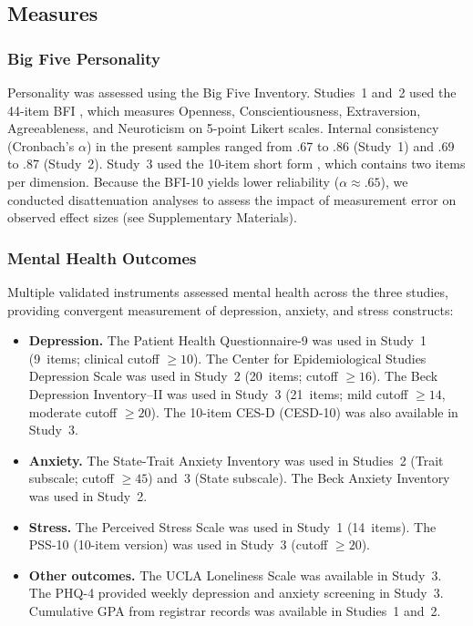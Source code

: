 \documentclass[12pt, a4paper]{article}
\begin{document}
\subsection{Measures}

\subsubsection{Big Five Personality}

Personality was assessed using the Big Five Inventory. Studies~1 and~2 used the 44-item BFI \citep[BFI-44;][]{john1999big}, which measures Openness, Conscientiousness, Extraversion, Agreeableness, and Neuroticism on 5-point Likert scales. Internal consistency (Cronbach's $\alpha$) in the present samples ranged from .67 to .86 (Study~1) and .69 to .87 (Study~2). Study~3 used the 10-item short form \citep[BFI-10;][]{rammstedt2007measuring}, which contains two items per dimension. Because the BFI-10 yields lower reliability ($\alpha \approx .65$), we conducted disattenuation analyses to assess the impact of measurement error on observed effect sizes (see Supplementary Materials).

\subsubsection{Mental Health Outcomes}

Multiple validated instruments assessed mental health across the three studies, providing convergent measurement of depression, anxiety, and stress constructs:

\begin{itemize}
    \item \textbf{Depression.} The Patient Health Questionnaire-9 \citep[PHQ-9;][]{kroenke2001phq9} was used in Study~1 (9~items; clinical cutoff $\geq 10$). The Center for Epidemiological Studies Depression Scale \citep[CES-D;][]{radloff1977cesd} was used in Study~2 (20~items; cutoff $\geq 16$). The Beck Depression Inventory--II \citep[BDI-II;][]{beck1996bdi} was used in Study~3 (21~items; mild cutoff $\geq 14$, moderate cutoff $\geq 20$). The 10-item CES-D (CESD-10) was also available in Study~3.
    \item \textbf{Anxiety.} The State-Trait Anxiety Inventory \citep[STAI;][]{spielberger1983manual} was used in Studies~2 (Trait subscale; cutoff $\geq 45$) and~3 (State subscale). The Beck Anxiety Inventory \citep[BAI;][]{beck1988inventory} was used in Study~2.
    \item \textbf{Stress.} The Perceived Stress Scale \citep[PSS;][]{cohen1983global} was used in Study~1 (14~items). The PSS-10 (10-item version) was used in Study~3 (cutoff $\geq 20$).
    \item \textbf{Other outcomes.} The UCLA Loneliness Scale \citep{russell1996ucla} was available in Study~3. The PHQ-4 \citep{lowe2010phq4} provided weekly depression and anxiety screening in Study~3. Cumulative GPA from registrar records was available in Studies~1 and~2.
\end{itemize}
\end{document}
